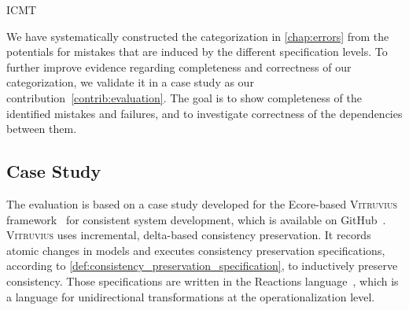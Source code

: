 \begin{copiedFrom}{ICMT}

We have systematically constructed the categorization in \autoref{chap:errors} from the potentials for mistakes that are induced by the different specification levels. %
To further improve evidence regarding completeness and correctness of %
our categorization, we validate it in a case study as our contribution~\ref{contrib:evaluation}.
The goal is 
 to show completeness of the identified mistakes and failures, and
 to investigate correctness of the dependencies between them. %


\subsection{Case Study}
The evaluation is based on a case study developed for the Ecore-based \textsc{Vitruvius} framework~\cite{kramer2013b} for consistent system development, which is available on GitHub~\cite{vitruvFrameworkGithub}.
\textsc{Vitruvius} uses incremental, delta-based consistency preservation. 
It records atomic changes in models and executes consistency preservation specifications, according to \autoref{def:consistency_preservation_specification}, to inductively preserve consistency.
Those specifications are written in the Reactions language~\cite{klare2016b}, which is a language for unidirectional transformations at the operationalization level.


\end{copiedFrom}
